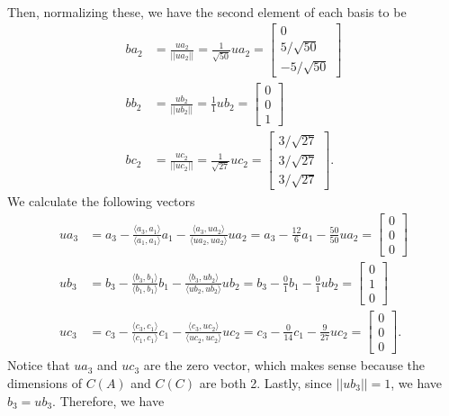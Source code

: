 \documentclass[11pt]{article}
\begin{document}
\begin{itemize}
\begin{align*}
\end{align*}
Then, normalizing these, we have the second element of each basis to be
\begin{align*}
ba_2 &= \frac{ua_2}{||ua_2||} = \frac{1}{\sqrt{50}}ua_2 = \begin{bmatrix}
0 \\ 5/\sqrt{50} \\ -5/\sqrt{50}
\end{bmatrix} \\
bb_2 &= \frac{ub_2}{||ub_2||} = \frac{1}{1}ub_2 = \begin{bmatrix}
0 \\ 0 \\ 1
\end{bmatrix} \\
bc_2 &= \frac{uc_2}{||uc_2||} = \frac{1}{\sqrt{27}}uc_2 = \begin{bmatrix}
3/\sqrt{27} \\ 3/\sqrt{27} \\ 3/\sqrt{27}
\end{bmatrix}.
\end{align*}
We calculate the following vectors
\begin{align*}
ua_3 &= a_3 - \frac{\langle a_3, a_1 \rangle}{\langle a_1, a_1 \rangle}a_1 - \frac{\langle a_3, ua_2\rangle}{\langle ua_2,ua_2\rangle}ua_2 = a_3 - \frac{12}{6}a_1 - \frac{50}{50}ua_2 = \begin{bmatrix}
0 \\ 0 \\ 0
\end{bmatrix} \\
ub_3 &= b_3 - \frac{\langle b_3, b_1 \rangle}{\langle b_1, b_1 \rangle}b_1 - \frac{\langle b_3, ub_2\rangle}{\langle ub_2,ub_2\rangle}ub_2 = b_3 - \frac{0}{1}b_1 - \frac{0}{1}ub_2 = \begin{bmatrix}
0 \\ 1 \\ 0
\end{bmatrix} \\
uc_3 &= c_3 - \frac{\langle c_3, c_1 \rangle}{\langle c_1, c_1 \rangle}c_1 - \frac{\langle c_3, uc_2\rangle}{\langle uc_2,uc_2\rangle}uc_2 = c_3 - \frac{0}{14}c_1 - \frac{9}{27}uc_2 = \begin{bmatrix}
0 \\ 0 \\ 0
\end{bmatrix}.
\end{align*}
Notice that $ua_3$ and $uc_3$ are the zero vector, which makes sense because the dimensions of $C(A)$ and $C(C)$ are both 2.  Lastly, since $||ub_3|| = 1$, we have $b_3 = ub_3$.  Therefore, we have

\end{itemize}
\end{document}
